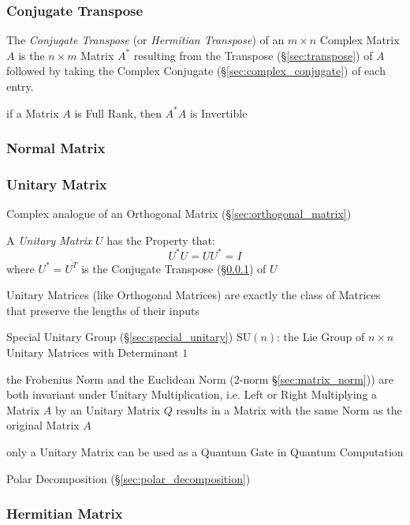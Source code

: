 \subsubsection{Conjugate Transpose}\label{sec:conjugate_transpose}

The \emph{Conjugate Transpose} (or \emph{Hermitian Transpose}) of an $m \times
n$ Complex Matrix $A$ is the $n \times m$ Matrix $A^*$ resulting from the
Transpose (\S\ref{sec:transpose}) of $A$ followed by taking the Complex
Conjugate (\S\ref{sec:complex_conjugate}) of each entry.

if a Matrix $A$ is Full Rank, then $A^*A$ is Invertible



\subsubsection{Normal Matrix}\label{sec:normal_matrix}

\subsubsection{Unitary Matrix}\label{sec:unitary_matrix}

Complex analogue of an Orthogonal Matrix (\S\ref{sec:orthogonal_matrix})

A \emph{Unitary Matrix} $U$ has the Property that:
\[
  U^*U = UU^* = I
\]
where $U^* = \overline{U^T}$ is the Conjugate Transpose
(\S\ref{sec:conjugate_transpose}) of $U$

Unitary Matrices (like Orthogonal Matrices) are exactly the class of Matrices
that preserve the lengths of their inputs

\fist Special Unitary Group (\S\ref{sec:special_unitary})
$\mathrm{SU}(n)$: the Lie Group of $n \times n$ Unitary Matrices with
Determinant $1$

the Frobenius Norm and the Euclidean Norm ($2$-norm \S\ref{sec:matrix_norm}))
are both invariant under Unitary Multiplication, i.e. Left or Right Multiplying
a Matrix $A$ by an Unitary Matrix $Q$ results in a Matrix with the same Norm as
the original Matrix $A$

only a Unitary Matrix can be used as a Quantum Gate in Quantum Computation

Polar Decomposition (\S\ref{sec:polar_decomposition})



\subsubsection{Hermitian Matrix}\label{sec:hermitian_matrix}

